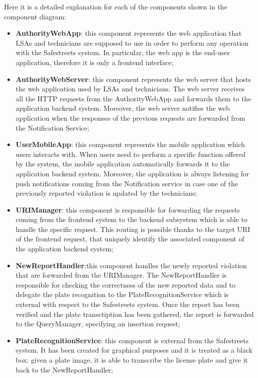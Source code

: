 Here it is a detailed explanation for each of the components shown in the component diagram:
\begin{itemize}
    \item \textbf{AuthorityWebApp}: this component represents the web application that LSAs and technicians are supposed to use in order to perform any operation with the Safestreets system. In particular, the web app is the end-user application, therefore it is only a frontend interface;
    \item \textbf{AuthorityWebServer}: this component represents the web server that hosts the web application used by LSAs and technicians. The web server receives all the HTTP requests from the AuthorityWebApp and forwards them to the application backend system. Moreover, the web server notifies the web application when the responses of the previous requests are forwarded from the Notification Service;
    \item \textbf{UserMobileApp}: this component represents the mobile application which users interacts with. When users need to perform a specific function offered by the system, the mobile application automatically forwards it to the application backend system. Moreover, the application is always listening for push notifications coming from the Notification service in case one of the previously reported violation is updated by the technicians;
    \item \textbf{URIManager}: this component is responsible for forwarding the requests coming from the frontend system to the backend subsystem which is able to handle the specific request. This routing is possible thanks to the target URI of the frontend request, that uniquely identify the associated component of the application backend system;
    \item \textbf{NewReportHandler}:this component handles the newly reported violation that are forwarded from the URIManager. The NewReportHandler is responsible for checking the correctness of the new reported data and to delegate the plate recognition to the PlateRecognitionService which is external with respect to the Safestreets system. Once the report has been verified and the plate transctiption has been gathered, the report is forwarded to the QueryManager, specifying an insertion request;
    \item \textbf{PlateRecognitionService}: this component is external from the Safestreets system. It has been created for graphical purposes and it is treated as a black box: given a plate image, it is able to transcribe the license plate and give it back to the NewReportHandler;

\end{itemize}
